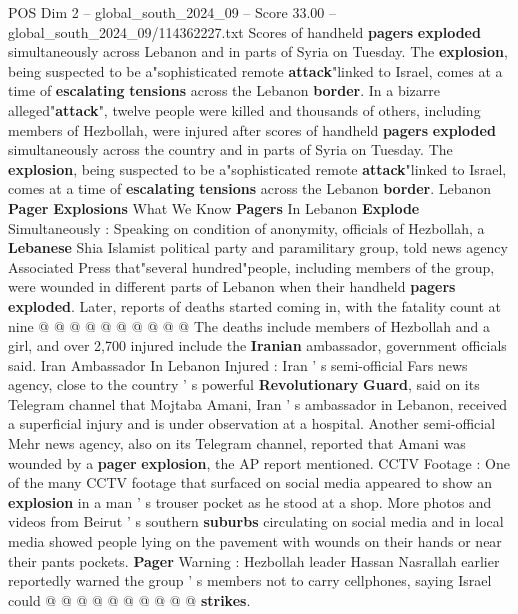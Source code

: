 \begin{textsample}{POS Dim 2 – global\_south\_2024\_09 – Score 33.00 – global\_south\_2024\_09/114362227.txt}  \label{ex:f2_pos_033}
Scores of handheld \textbf{pagers} \textbf{exploded} simultaneously across Lebanon and in parts of Syria on Tuesday.
The \textbf{explosion}, being suspected to be a"sophisticated remote \textbf{attack}"linked to Israel, comes at a time of \textbf{escalating} \textbf{tensions} across the Lebanon \textbf{border}.
In a bizarre alleged"\textbf{attack}", twelve people were killed and thousands of others, including members of Hezbollah, were injured after scores of handheld \textbf{pagers} \textbf{exploded} simultaneously across the country and in parts of Syria on Tuesday.
The \textbf{explosion}, being suspected to be a"sophisticated remote \textbf{attack}"linked to Israel, comes at a time of \textbf{escalating} \textbf{tensions} across the Lebanon \textbf{border}.
Lebanon \textbf{Pager} \textbf{Explosions} What We Know \textbf{Pagers} In Lebanon \textbf{Explode} Simultaneously : Speaking on condition of anonymity, officials of Hezbollah, a \textbf{Lebanese} Shia Islamist political party and paramilitary group, told news agency Associated Press that"several hundred"people, including members of the group, were wounded in different parts of Lebanon when their handheld \textbf{pagers} \textbf{exploded}.
Later, reports of deaths started coming in, with the fatality count at nine @ @ @ @ @ @ @ @ @ @ The deaths include members of Hezbollah and a girl, and over 2,700 injured include the \textbf{Iranian} ambassador, government officials said.
Iran Ambassador In Lebanon Injured : Iran ' s semi-official Fars news agency, close to the country ' s powerful \textbf{Revolutionary} \textbf{Guard}, said on its Telegram channel that Mojtaba Amani, Iran ' s ambassador in Lebanon, received a superficial injury and is under observation at a hospital.
Another semi-official Mehr news agency, also on its Telegram channel, reported that Amani was wounded by a \textbf{pager} \textbf{explosion}, the AP report mentioned.
CCTV Footage : One of the many CCTV footage that surfaced on social media appeared to show an \textbf{explosion} in a man ' s trouser pocket as he stood at a shop.
More photos and videos from Beirut ' s southern \textbf{suburbs} circulating on social media and in local media showed people lying on the pavement with wounds on their hands or near their pants pockets. \textbf{Pager} Warning : Hezbollah leader Hassan Nasrallah earlier reportedly warned the group ' s members not to carry cellphones, saying Israel could @ @ @ @ @ @ @ @ @ @ \textbf{strikes}.

\end{textsample}
